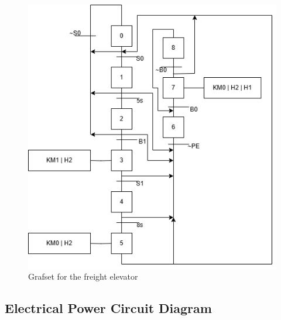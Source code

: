\begin{figure}[H]
    \includegraphics[width=16cm]{Images/Q3/grafset.png}
    \centering
    \caption{Grafset for the freight elevator}
    \label{fig:grafset}
\end{figure}

\subsection{Electrical Power Circuit Diagram} \label{sec:Electrical_Power_Circuit_Diagram}

